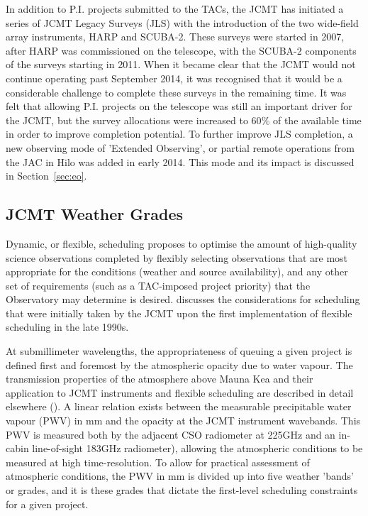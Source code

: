 \documentclass[]{spie}  %
\begin{document}
In addition to P.I. projects submitted to the TACs, the JCMT has
initiated a series of JCMT Legacy Surveys (JLS) with the introduction
of the two wide-field array instruments, HARP and SCUBA-2. These
surveys were started in 2007, after HARP was commissioned on the
telescope, with the SCUBA-2 components of the surveys starting in
2011. When it became clear that the JCMT would not continue operating
past September 2014, it was recognised that it would be a considerable
challenge to complete these surveys in the remaining time. It was felt
that allowing P.I. projects on the telescope was still an important
driver for the JCMT, but the survey allocations were increased to
60$\%$ of the available time in order to improve completion
potential. To further improve JLS completion, a new observing mode of
'Extended Observing', or partial remote operations from the JAC in
Hilo was added in early 2014. This mode and its impact is discussed in
Section~\ref{sec:eo}.

\subsection{JCMT Weather Grades}

Dynamic, or flexible, scheduling proposes to optimise the amount of
high-quality science observations completed by flexibly selecting
observations that are most appropriate for the conditions (weather and
source availability), and any other set of requirements (such as a
TAC-imposed project priority) that the Observatory may determine is
desired. \cite{tilanus2000} discusses the considerations for
scheduling that were initially taken by the JCMT upon the first
implementation of flexible scheduling in the late 1990s.

At submillimeter wavelengths, the appropriateness of queuing a given
project is defined first and foremost by the atmospheric opacity due
to water vapour. The transmission properties of the atmosphere above
Mauna Kea and their application to JCMT instruments and flexible
scheduling are described in detail elsewhere (\cite{robson2002}). A
linear relation exists between the measurable precipitable water
vapour (PWV) in mm and the opacity at the JCMT instrument
wavebands. This PWV is measured both by the adjacent CSO radiometer at
225GHz and an in-cabin line-of-sight 183GHz radiometer\cite{wiedner}),
allowing the atmospheric conditions to be measured at high
time-resolution. To allow for practical assessment of atmospheric
conditions, the PWV in mm is divided up into five weather 'bands' or
grades, and it is these grades that dictate the first-level scheduling
constraints for a given project.
\end{document}
